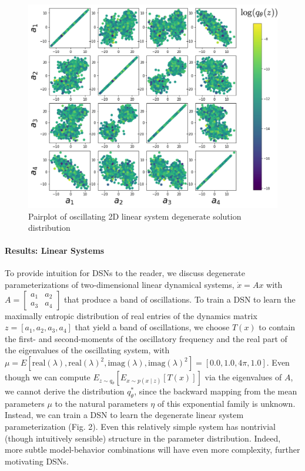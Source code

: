\documentclass[12pt]{article}
\begin{document}
 \setlength{\abovecaptionskip}{-3mm}
\begin{figure}
 \caption{\label{fig:fig2} Pairplot of oscillating 2D linear system degenerate solution distribution }
  \begin{center}  
\includegraphics[scale=.3]{images/CosyneAbstract/Fig2.png} 
\end{center}
\end{figure}

\paragraph{Results: Linear Systems}   To provide intuition for DSNs to the reader, we discuss degenerate parameterizations of two-dimensional linear dynamical systems, $\dot{x} = Ax$ with $A = \begin{bmatrix} a_1 & a_2 \\ a_3 & a_4 \end{bmatrix}$ that produce a band of oscillations. To train a DSN to learn the maximally entropic distribution of real entries of the dynamics matrix $z = \left[a_1, a_2, a_3, a_4 \right]$ that yield a band of oscillations, we choose $T(x)$ to contain the first- and second-moments of the oscillatory frequency and the real part of the eigenvalues of the oscillating system, with $\mu = E \left[\text{real}(\lambda), \text{real}(\lambda)^2, \text{imag}(\lambda), \text{imag}(\lambda)^2\right] = \left[0.0, 1.0, 4\pi, 1.0 \right]$. Even though we can compute $E_{z \sim q_\theta}\left[ E_{x\sim p(x \mid z)}\left[T(x)\right] \right]$ via the eigenvalues of $A$, we cannot derive the distribution $q^*_\theta$, since the backward mapping from the mean parameters $\mu$ to the natural parameters $\eta$ of this exponential family is unknown.  Instead, we can train a DSN to learn the degenerate linear system parameterization (Fig. 2). Even this relatively simple system has nontrivial (though intuitively sensible) structure in the parameter distribution.  Indeed, more subtle model-behavior combinations will have even more complexity, further motivating DSNs. \\
\end{document}
